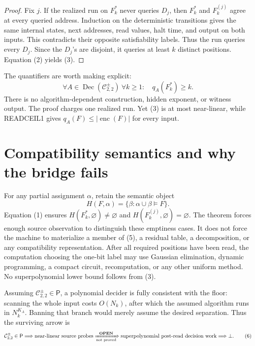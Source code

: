 \documentclass[11pt]{article}
\newcommand{\Core}{\mathcal C_{2,2}^{\pm}}
\newcommand{\OPEN}{\textbf{OPEN}}
\begin{document}
\begin{proof}
Fix \(j\).  If the realized run on \(F_k^*\) never queries \(D_j\), then
\(F_k^*\) and \(F_k^{(j)}\) agree at every queried address.  Induction on the
deterministic transitions gives the same internal states, next addresses,
read values, halt time, and output on both inputs.  This contradicts their
opposite satisfiability labels.  Thus the run queries every \(D_j\).  Since
the \(D_j\)'s are disjoint, it queries at least \(k\) distinct positions.
Equation (2) yields (3).
\end{proof}

The quantifiers are worth making explicit:
\[
 \forall A\in\operatorname{Dec}(\Core)\ \forall k\ge1:\quad
 q_A(F_k^*)\ge k.                                         \tag{4}
\]
There is no algorithm-dependent construction, hidden exponent, or witness
output.  The proof charges one realized run.  Yet (3) is at most near-linear,
while READCEIL1 gives \(q_A(F)\le |\operatorname{enc}(F)|\) for every input.

\section{Compatibility semantics and why the bridge fails}
For any partial assignment \(\alpha\), retain the semantic object
\[
 H(F,\alpha)=\{\beta:\alpha\cup\beta\models F\}.           \tag{5}
\]
Equation (1) ensures \(H(F_k^*,\varnothing)\ne\varnothing\) and
\(H(F_k^{(j)},\varnothing)=\varnothing\).  The theorem forces enough source
observation to distinguish these emptiness cases.  It does not force the
machine to materialize a member of (5), a residual table, a decomposition, or
any compatibility representation.  After all required positions have been
read, the computation choosing the one-bit label may use Gaussian elimination,
dynamic programming, a compact circuit, recomputation, or any other uniform
method.  No superpolynomial lower bound follows from (3).

Assuming \(\Core\in\mathsf P\), a polynomial decider is fully consistent with
the floor: scanning the whole input costs \(O(N_k)\), after which the assumed
algorithm runs in \(N_k^{K_A}\).  Banning that branch would merely assume the
desired separation.  Thus the surviving arrow is
\[
 \Core\in\mathsf P
 \Longrightarrow \text{near-linear source probes}
 \xRightarrow[\text{not proved}]{\OPEN}
 \text{superpolynomial post-read decision work}
 \Longrightarrow\bot .                                   \tag{6}
\]
\end{document}
